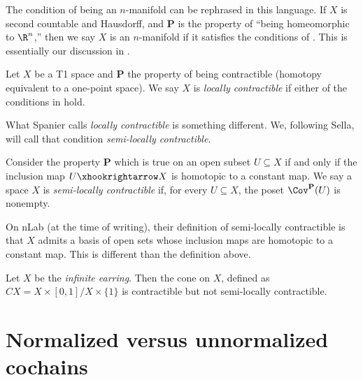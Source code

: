 \documentclass[11pt]{book}
\begin{document}
\begin{remark} The condition of being an $n$-manifold can be rephrased in this language. If $X$ is second countable and Hausdorff, and \textbf{P} is the property of ``being homeomorphic to $\R^n$,'' then we say $X$ is an $n$-manifold if it satisfies the conditions of . This is essentially our discussion in .
\end{remark}

\begin{definition}\label{def:locally-contractible} Let $X$ be a T1 space and \textbf{P} the property of being contractible (homotopy equivalent to a one-point space). We say $X$ is \emph{locally contractible} if either of the conditions in  hold.
\end{definition}

What Spanier calls \emph{locally contractible} is something different. We, following Sella, will call that condition \emph{semi-locally contractible}.

\begin{definition}\label{def:semi-locally-contractible} Consider the property \textbf{P} which is true on an open subset $U \subseteq X$ if and only if the inclusion map $U \hookto X$ is homotopic to a constant map. We say a space $X$ is \emph{semi-locally contractible} if, for every $U \subseteq X$, the poset $\Cov^{\mathbf{P}}(U)$ is nonempty.
\end{definition}

\begin{remark} On nLab (at the time of writing), their definition of semi-locally contractible is that $X$ admits a basis of open sets whose inclusion maps are homotopic to a constant map. This is different than the definition above.
\end{remark}

\begin{example} Let $X$ be the \emph{infinite earring}. Then the cone on $X$, defined as $CX = X \times [0,1] / X \times \{1\}$ is contractible but not semi-locally contractible.
\end{example}

\section{Normalized versus unnormalized cochains}
\end{document}
